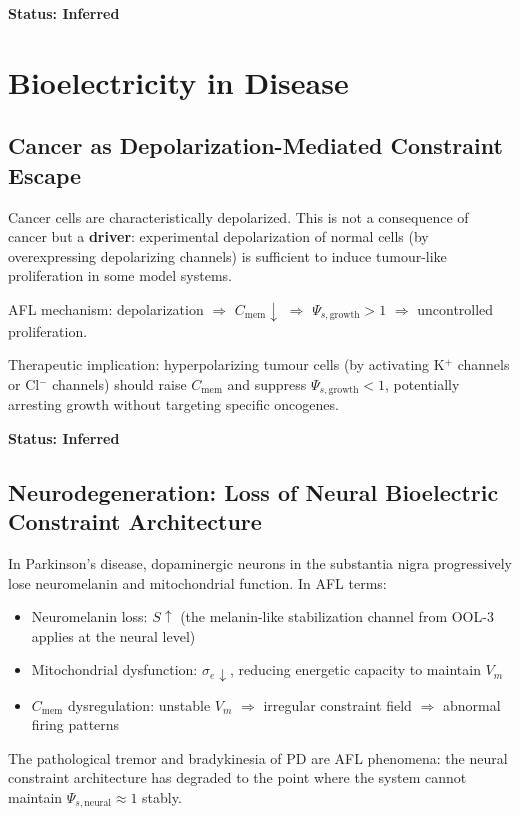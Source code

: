 \documentclass[12pt,a4paper]{article}
\begin{document}
\textbf{Status: Inferred}

\section{Bioelectricity in Disease}

\subsection{Cancer as Depolarization-Mediated Constraint Escape}

Cancer cells are characteristically depolarized. This is not a consequence of cancer but a \textbf{driver}: experimental depolarization of normal cells (by overexpressing depolarizing channels) is sufficient to induce tumour-like proliferation in some model systems.

AFL mechanism: depolarization $\Rightarrow$ $C_{\mathrm{mem}} \downarrow$ $\Rightarrow$ $\Psi_{s,\mathrm{growth}} > 1$ $\Rightarrow$ uncontrolled proliferation.

Therapeutic implication: hyperpolarizing tumour cells (by activating K$^+$ channels or Cl$^-$ channels) should raise $C_{\mathrm{mem}}$ and suppress $\Psi_{s,\mathrm{growth}} < 1$, potentially arresting growth without targeting specific oncogenes.

\textbf{Status: Inferred}

\subsection{Neurodegeneration: Loss of Neural Bioelectric Constraint Architecture}

In Parkinson's disease, dopaminergic neurons in the substantia nigra progressively lose neuromelanin and mitochondrial function. In AFL terms:
\begin{itemize}
    \item Neuromelanin loss: $S \uparrow$ (the melanin-like stabilization channel from OOL-3 applies at the neural level)
    \item Mitochondrial dysfunction: $\sigma_e \downarrow$, reducing energetic capacity to maintain $V_m$
    \item $C_{\mathrm{mem}}$ dysregulation: unstable $V_m$ $\Rightarrow$ irregular constraint field $\Rightarrow$ abnormal firing patterns
\end{itemize}

The pathological tremor and bradykinesia of PD are AFL phenomena: the neural constraint architecture has degraded to the point where the system cannot maintain $\Psi_{s,\mathrm{neural}} \approx 1$ stably.
\end{document}
